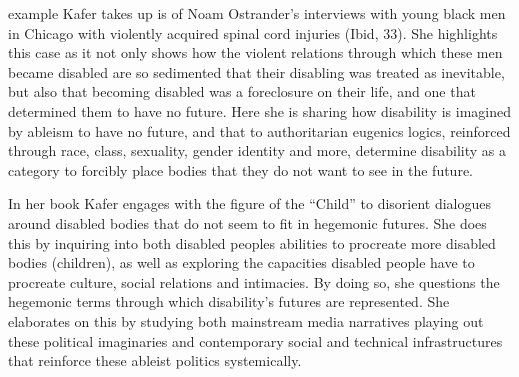 example Kafer takes up is of Noam Ostrander's interviews with young
black men in Chicago with violently acquired spinal cord injuries (Ibid,
33). She highlights this case as it not only shows how the violent
relations through which these men became disabled are so sedimented that
their disabling was treated as inevitable, but also that becoming
disabled was a foreclosure on their life, and one that determined them
to have no future. Here she is sharing how disability is imagined by
ableism to have no future, and that to authoritarian eugenics logics,
reinforced through race, class, sexuality, gender identity and more,
determine disability as a category to forcibly place bodies that they do
not want to see in the future.

In her book Kafer engages with the figure of the ``Child'' to disorient
dialogues around disabled bodies that do not seem to fit in hegemonic
futures. She does this by inquiring into both disabled peoples abilities
to procreate more disabled bodies (children), as well as exploring the
capacities disabled people have to procreate culture, social relations
and intimacies. By doing so, she questions the hegemonic terms through
which disability's futures are represented. She elaborates on this by
studying both mainstream media narratives playing out these political
imaginaries and contemporary social and technical infrastructures that
reinforce these ableist politics systemically.

